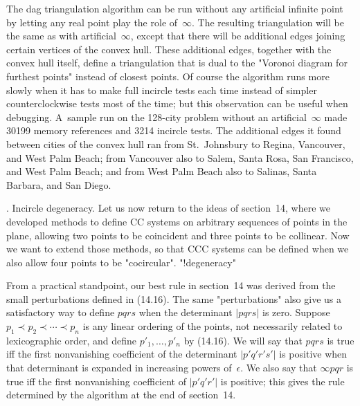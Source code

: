 The dag triangulation algorithm can be run without any artificial
infinite point by letting any real point play the role of~$\infty$.
The resulting triangulation will be the same as with
artificial~$\infty$, except that there will be additional edges joining
 certain vertices of the convex hull. These additional 
edges, together with the convex hull itself, 
define a triangulation that is dual to the "Voronoi diagram for
furthest points" instead of closest points. Of course the algorithm
runs more slowly when it has to make full incircle tests each time
instead of simpler counterclockwise tests most of the time; but this
observation can be useful when debugging. A~sample run on the 128-city
problem without an artificial~$\infty$ made 30199 memory references
and 3214 incircle tests. The additional edges it found between cities
of the convex hull ran from St.~Johnsbury to Regina, Vancouver, and
West Palm Beach; from Vancouver also to Salem, Santa Rosa, San
Francisco, and West Palm Beach; and from West Palm Beach also to
Salinas, Santa Barbara, and San Diego.

. Incircle degeneracy.
Let us now return to the ideas of section~14, where we developed
methods to define CC systems on arbitrary sequences of points in the
plane, allowing two points to be coincident and three points to be
collinear. Now we want to extend those methods, so that CCC
systems can be defined when we also allow four points to be "cocircular".
"!degeneracy"

From a practical standpoint, our best rule in section~14 was derived
from the small perturbations defined in (14.16). The same
"perturbations" also give us a satisfactory way to define $pqrs$ when
the determinant $\vert pqrs\vert$ is zero. Suppose $p_1\prec
p_2\prec\cdots\prec p_n$ is any linear ordering of the points, not
necessarily related to lexicographic order, and define
$p'_1,\ldots,p'_n$ by (14.16). We will say that $pqrs$ is true iff the
first nonvanishing coefficient of the determinant $\vert
p'q'r's'\vert$ is positive when that determinant is expanded in
increasing powers of~$\epsilon$. We also say that $\infty pqr$ is true
iff the first nonvanishing coefficient of $\vert p'q'r'\vert$ is
positive; this gives the rule determined by the algorithm at the end
of section~14.

